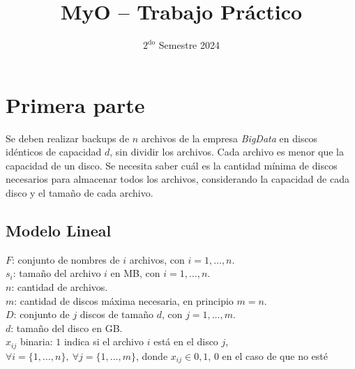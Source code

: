 \documentclass[11pt, a4paper, pdftex]{article}
\title{
	\huge MyO -- Trabajo Práctico\\
}
\author{
	\Mati \and \Xime \and \Lucifer \and \Lu
}
\date{\small $\text{2}^{\text{do}}$ Semestre 2024
}
\begin{document}
\renewcommand{\contentsname}{Contenidos}
\renewcommand{\listfigurename}{Listado de Figuras}
\renewcommand{\listtablename}{Listado de Tablas}
\renewcommand{\tablename}{Tabla}

\newcommand{\minimize}{\texttt{Minimize}\quad\,\,}
\newcommand{\maximize}{\texttt{Maximize}\quad\,\,}
\newcommand{\subjto}{\texttt{Subject to}\quad}

\maketitle

\tableofcontents

\section{Primera parte}

Se deben realizar backups de $n$ archivos de la empresa \emph{BigData}
en discos idénticos de capacidad $d$, sin dividir los archivos. Cada
archivo es menor que la capacidad de un disco. Se necesita saber cuál es
la cantidad mínima de discos necesarios para almacenar todos los
archivos, considerando la capacidad de cada disco y el tamaño de cada
archivo.

\subsection{Modelo Lineal}

$F$: conjunto de nombres de $i$ archivos, con $i = 1, \ldots, n$. \\

$s_{i}$: tamaño del archivo $i$ en MB, con $i = 1, \ldots, n$. \\

$n$: cantidad de archivos. \\

$m$: cantidad de discos máxima necesaria, en principio $m = n$. \\

$D$: conjunto de $j$ discos de tamaño $d$, con $j = 1, \ldots, m$. \\

$d$: tamaño del disco en GB. \\ 

$x_{ij}$ binaria: $1$ indica si el archivo $i$ está en el disco $j$, $\forall i = \{1, \ldots, n\},\ \forall j = \{1, \ldots, m\}$, donde $x_{ij} \in {0, 1}$, $0$ en el caso de que no esté\\
\end{document}
